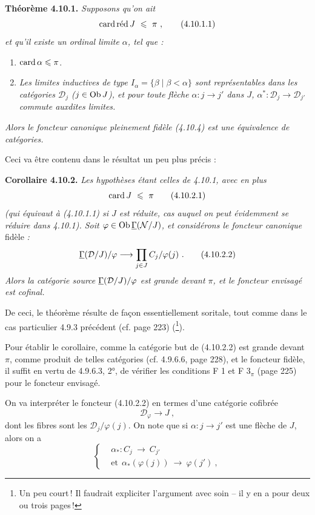 
\textbf{Théorème 4.10.1.} \textit{Supposons qu'on ait}
\[
\mathrm{card}\,\textup{réd}\, J \ \leqslant \ \pi \ , \tag*{(4.10.1.1)}
\]
\textit{et qu'il existe un ordinal limite $\alpha$, tel que :}
\begin{enumerate}[label={}, leftmargin=3em]
\item[\textit{1)}] $\operatorname{card} \alpha \leqslant \pi$.
\item[\textit{2)}] \textit{Les limites inductives de}
\textit{type $I_\alpha = \{\beta \mid \beta < \alpha\}$ sont représentables dans les catégories $\mathcal{D}_j$ ($j \in \operatorname{Ob} J$), et pour toute flèche $\alpha : j \longrightarrow j'$ dans $J$, $\alpha^* : \mathcal{D}_j \longrightarrow \mathcal{D}_{j'}$ commute auxdites limites.}
\end{enumerate}
\textit{Alors le foncteur canonique pleinement fidèle (4.10.4) est une équivalence de catégories.}

Ceci va être contenu dans le résultat un peu plus précis :

\textbf{Corollaire 4.10.2.} \textit{Les hypothèses étant celles de 4.10.1, avec en plus}
\[
\card J \ \leqslant \ \pi \tag*{(4.10.2.1)}
\]
\textit{(qui équivaut à (4.10.1.1) si $J$ est réduite, cas auquel on peut évidemment se réduire dans 4.10.1). Soit $\varphi \in \operatorname{Ob} \underline{\Gamma}(\mathcal{N}/J)$, et considérons le foncteur canonique} fidèle \textit{:}
\[
\underline{\Gamma}(\mathcal{D}/J)/\varphi \longrightarrow \prod_{j\in J} C_j/\varphi(j) \ . \tag*{(4.10.2.2)}
\]
\textit{Alors la catégorie source $\underline{\Gamma}(\mathcal{D}/J)/\varphi$ est grande devant $\pi$, et le foncteur envisagé est cofinal.}

De ceci, le théorème résulte de façon essentiellement soritale, tout comme dans le cas particulier 4.9.3 précédent (cf. page 223) (\footnote{Un peu court\,! Il faudrait expliciter l'argument avec soin – il y en a pour deux ou trois pages\,!}).

Pour établir le corollaire, comme la catégorie but de (4.10.2.2) est grande devant $\pi$, comme produit de telles catégories (cf. 4.9.6.6, page 228), et le foncteur fidèle, il suffit en vertu de 4.9.6.3, 2°, de vérifier les conditions F 1 et F 3$_\pi$ (page 225) pour le foncteur envisagé.

On va interpréter le foncteur (4.10.2.2) en termes d'une catégorie cofibrée
\[
\mathcal{D}_\varphi \longrightarrow J \ , \tag*{(4.10.5)}
\]
dont les fibres sont les $\mathcal{D}_j/\varphi(j)$. On note que si $\alpha : j \longrightarrow j'$ est une flèche de $J$, alors on a
\[
\left\{
\begin{aligned}
&\alpha_* : C_j \ \longrightarrow \ C_{j'} \\
&\text{et} \ \ \alpha_*(\varphi(j)) \ \longrightarrow \ \varphi(j') \ ,
\end{aligned}
\right.
\]

